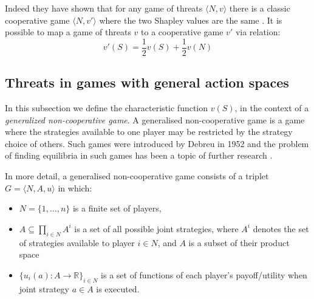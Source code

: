 Indeed they have shown that for any game of threats $\langle N,v\rangle$ there is a classic cooperative game $\langle N,v'\rangle$ where the two Shapley values are the same \cite{KOHLBERG2018139}.
It is possible to map a game of threats $v$ to a cooperative game $v'$ via relation:
\begin{equation}\label{convert1}
v'(S)=\frac{1}{2}v(S)+\frac{1}{2}v(N)
\end{equation}


\subsection{Threats in games with general action spaces}\label{the_value_def3}

In this subsection we define the characteristic function $v(S)$, in the context of a \textit{generalized non-cooperative game}.
A generalised non-cooperative game is a game where the strategies available to one player may be restricted by the strategy choice of others.
Such games were introduced by Debreu in 1952 \cite{Debreu01101952} and the problem of finding equilibria in such games has been a topic of further research \cite{Facchinei2007,fischer2014}.

In more detail, a generalised non-cooperative game consists of a triplet $G = \langle N,A,u \rangle$ in which:
\begin{itemize}
\item	$N=\{1,\dots,n\}$ is a finite set of players,
\item	$A\subseteq \prod_{i\in N}A^i$ is a set of all possible joint strategies, where $A^i$ denotes the set of strategies available to player $i\in N$, and $A$ is a subset of their product space
\item	$\{u_i(a) : A\rightarrow \mathbb{R}\}_{i\in N}$ is a set of functions of each player's payoff/utility when joint strategy $a\in A$ is executed.
\end{itemize}

